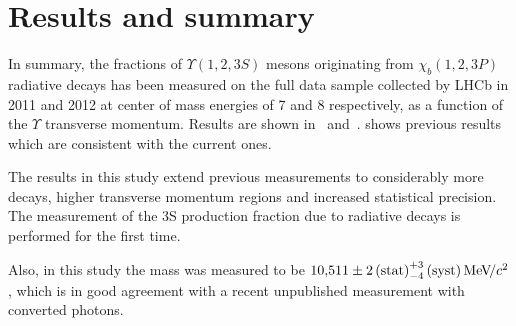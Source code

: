 \section{Results and summary}
\label{sec:results}

In summary, the fractions of $\Upsilon(1,2,3S)$ mesons originating from $\chi_b(1,2,3P)$ 
radiative decays has been measured on the full data sample collected by LHCb in 2011 and 2012 
at center of mass energies of 7 and 8 \tev respectively, as a function of the $\Upsilon$ 
transverse momentum. Results are shown in~
and~.
 shows previous \lhcb results which
are consistent with the current ones.







The results in this study extend previous \lhcb measurements to considerably
more decays, higher transverse momentum regions and increased statistical
precision. The measurement of the 
\Y3S production fraction due to radiative \chibThreeP decays is performed for the first time.

Also, in this study the \chiboneThreeP mass was measured to be $10{,}511 \pm
2\mathrm{\,(stat)}^{+3}_{-4}\mathrm{\,(syst)} {\mathrm{\,Me\kern -0.1em V\!/}c^2}$, which is in good agreement with a recent
unpublished \lhcb measurement with converted photons.


